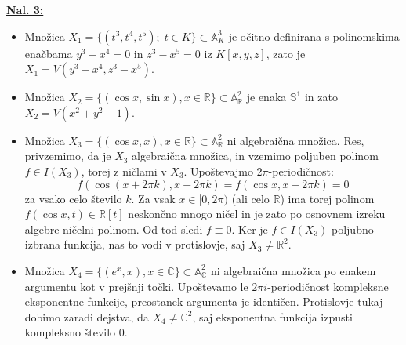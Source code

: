 \documentclass[a4paper, 12pt]{article} %
\renewcommand{\S}{\mathbb{S}}
\newcommand{\R}{\mathbb{R}}
\newcommand{\C}{\mathbb{C}}
\begin{document}
\underline{\textbf{Nal. 3:}}
\begin{itemize}
	\item Množica $X_1 = \lbrace(t^3, t^4, t^5) ; \; t \in K\rbrace \subset \mathbb{A}_K^3$ je očitno definirana s polinomskima enačbama $y^3 - x^4 = 0$ in $z^3 - x^5 = 0$ iz $K[x,y,z]$, zato je $X_1 = V(y^3-x^4, z^3-x^5)$.
	\item Množica $X_2 = \lbrace(\cos x, \sin x), x \in \R \rbrace \subset \mathbb{A}_\R^2$ je enaka $\S^1$ in zato $X_2 = V(x^2 + y^2 -1)$.
	\item Množica $X_3 = \lbrace (\cos x, x), x \in \R \rbrace  \subset \mathbb{A}_\R^2$ ni algebraična množica. Res, privzemimo, da je $X_3$ algebraična množica, in vzemimo poljuben polinom $f \in I(X_3)$, torej z ničlami v $X_3$. Upoštevajmo $2\pi$-periodičnost:
	\[
	f(\cos(x + 2\pi k), x + 2\pi k) = f(\cos x, x + 2\pi k) = 0
	\]
	za vsako celo število $k$. Za vsak $x \in [0, 2\pi)$ (ali celo $\R$) ima torej polinom $f(\cos x, t) \in \R[t]$ neskončno mnogo ničel in je zato po osnovnem izreku algebre ničelni polinom. Od tod sledi $f \equiv 0$. Ker je $f \in I(X_3)$ poljubno izbrana funkcija, nas to vodi v protislovje, saj $X_3 \neq \R^2$.
	\item Množica $X_4 = \lbrace (e^x, x), x \in \C \rbrace  \subset \mathbb{A}_\C^2$ ni algebraična množica po enakem argumentu kot v prejšnji točki. Upoštevamo le $2\pi i$-periodičnost kompleksne eksponentne funkcije, preostanek argumenta je identičen. Protislovje tukaj dobimo zaradi dejstva, da $X_4 \neq \C^2$, saj eksponentna funkcija izpusti kompleksno število $0$.
\end{itemize}
\end{document}
